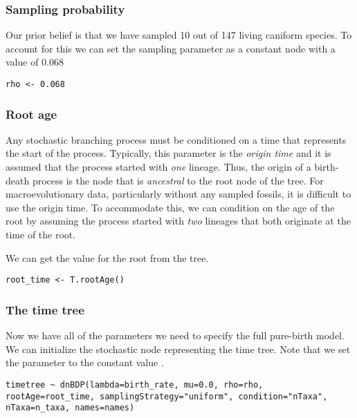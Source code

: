 \subsubsection{Sampling probability}

Our prior belief is that we have sampled 10 out of 147 living caniform species. 
To account for this we can set the sampling parameter as a constant node with a value of 0.068
{\tt \begin{snugshade*}
\begin{lstlisting}
rho <- 0.068
\end{lstlisting}
\end{snugshade*}}


\subsubsection{Root age}

Any stochastic branching process must be conditioned on a time that represents the start of the process. 
Typically, this parameter is the \textit{origin time} and it is assumed that the process started with \textit{one} lineage. 
Thus, the origin of a birth-death process is the node that is \textit{ancestral} to the root node of the tree.
For macroevolutionary data, particularly without any sampled fossils, it is difficult to use the origin time.
To accommodate this, we can condition on the age of the root by assuming the process started with \textit{two} lineages that both originate at the time of the root.

We can get the value for the root from the \citet{dosReis2012} tree.

{\tt \begin{snugshade*}
\begin{lstlisting}
root_time <- T.rootAge()
\end{lstlisting}
\end{snugshade*}}

\subsubsection{The time tree}

Now we have all of the parameters we need to specify the full pure-birth model. 
We can initialize the stochastic node representing the time tree.
Note that we set the  parameter to the constant value .
{\tt \begin{snugshade*}
\begin{lstlisting}
timetree ~ dnBDP(lambda=birth_rate, mu=0.0, rho=rho, rootAge=root_time, samplingStrategy="uniform", condition="nTaxa", nTaxa=n_taxa, names=names)\end{lstlisting}
\end{snugshade*}}

